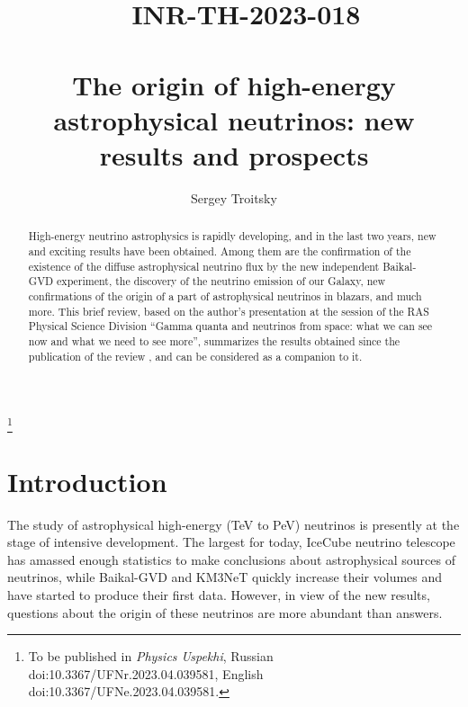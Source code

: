 \documentclass[a4paper,noshowpacs,noshowkeys,floatfix,twocolumn,preprintnumbers,nofootinbib]{revtex4-2}
\begin{document}
\title{
{~ \hfill \rm INR-TH-2023-018}\\
~\\
The origin of high-energy astrophysical neutrinos: new results and prospects}
\thanks{To be published in \textit{Physics Uspekhi}, Russian
doi:10.3367/UFNr.2023.04.039581, English
doi:10.3367/UFNe.2023.04.039581.}
\author{Sergey Troitsky} 
\begin{abstract}
High-energy neutrino astrophysics is rapidly developing, and in the last two years, new and exciting results have been obtained. Among them are the confirmation of the existence of the diffuse astrophysical neutrino flux by the new independent Baikal-GVD experiment, the discovery of the neutrino emission of our Galaxy, new confirmations of the origin of a part of astrophysical neutrinos in blazars, and much more. This brief review, based on the author's presentation at the session of the RAS Physical Science Division ``Gamma quanta and neutrinos from space: what we can see now and what we need to see more'', summarizes the results obtained since the publication of the review \cite{ST-UFN}, and can be
considered as a companion to it.
\end{abstract}
\maketitle


\thispagestyle{empty}
\newpage
\setcounter{page}{1}
\tableofcontents

\section{Introduction}
\label{sec:intro}
The study of astrophysical high-energy (TeV to PeV) neutrinos is presently at the stage of intensive development. The largest for today, IceCube neutrino telescope has amassed enough statistics to make conclusions about astrophysical sources of neutrinos, while Baikal-GVD and KM3NeT quickly increase their volumes and have started to produce their first data. However, in view of the new results, questions about the origin of these neutrinos are more abundant than answers.
\end{document}
